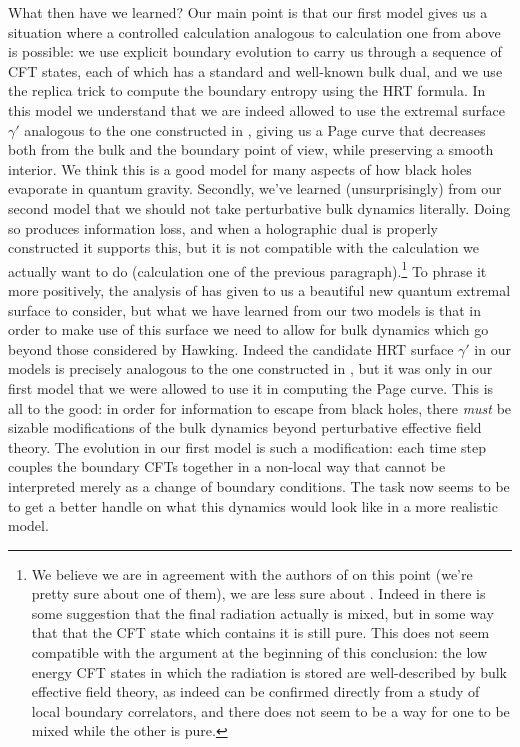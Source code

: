 \documentclass[12pt]{article}
\theoremstyle{definition}
\begin{document}
What then have we learned?  Our main point is that our first model gives us a situation where a controlled calculation analogous to calculation one from above is possible: we use explicit boundary evolution to carry us through a sequence of CFT states, each of which has a standard and well-known bulk dual, and we use the replica trick to compute the boundary entropy using the HRT formula.  In this model we understand that we are indeed allowed to use the extremal surface $\gamma'$ analogous to the one constructed in \cite{Almheiri:2019psf,Penington:2019npb}, giving us a Page curve that decreases both from the bulk and the boundary point of view, while preserving a smooth interior. We think this is a good model for many aspects of how black holes evaporate in quantum gravity.   Secondly, we've learned (unsurprisingly) from our second model that we should not take perturbative bulk dynamics literally.  Doing so produces information loss, and when a holographic dual is properly constructed it supports this, but it is not compatible with the calculation we actually want to do (calculation one of the previous paragraph).\footnote{We believe we are in agreement with the authors of \cite{Almheiri:2019psf} on this point (we're pretty sure about one of them), we are less sure about \cite{Penington:2019npb}.  Indeed in \cite{Penington:2019npb} there is some suggestion that the final radiation actually is mixed, but in some way that that the CFT state which contains it is still pure.  This does not seem compatible with the argument at the beginning of this conclusion: the low energy CFT states in which the radiation is stored are well-described by bulk effective field theory, as indeed can be confirmed directly from a study of local boundary correlators, and there does not seem to be a way for one to be mixed while the other is pure.}  To phrase it more positively, the analysis of \cite{Almheiri:2019psf,Penington:2019npb,Almheiri:2019hni} has given to us a beautiful new quantum extremal surface to consider, but what we have learned from our two models is that in order to make use of this surface we need to allow for bulk dynamics which go beyond those considered by Hawking.  Indeed the candidate HRT surface $\gamma'$ in our models is precisely analogous to the one constructed in \cite{Almheiri:2019psf,Penington:2019npb,Almheiri:2019hni}, but it was only in our first model that we were allowed to use it in computing the Page curve.  This is all to the good: in order for information to escape from black holes, there \textit{must} be sizable modifications of the bulk dynamics beyond perturbative effective field theory.  The evolution in our first model is such a modification: each time step couples the boundary CFTs together in a non-local way that cannot be interpreted merely as a change of boundary conditions.  The task now seems to be to get a better handle on what this dynamics would look like in a more realistic model. 
\end{document}
